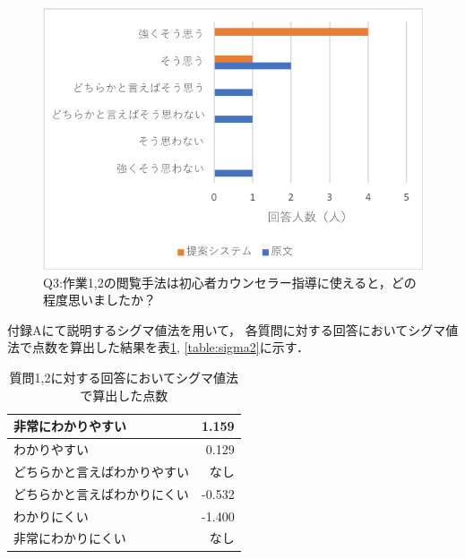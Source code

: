 \documentclass[shuuron]{kuee}
\begin{document}
\begin{figure}
  \begin{center}
    \includegraphics[width=\linewidth]{q3.png}
  \end{center}
  \caption{Q3:作業1,2の閲覧手法は初心者カウンセラー指導に使えると，どの程度思いましたか？}
  \label{fig:q3}
\end{figure}

付録Aにて説明するシグマ値法を用いて，
各質問に対する回答においてシグマ値法で点数を算出した結果を表\ref{table:sigma}, \ref{table:sigma2}に示す．


\begin{table}
  \caption{質問1,2に対する回答においてシグマ値法で算出した点数}
  \label{table:sigma}
  \begin{center}
    \begin{tabular}{|l|r|} \hline
      非常にわかりやすい & 1.159 \\ \hline
      わかりやすい  & 0.129 \\ \hline
      どちらかと言えばわかりやすい & なし \\ \hline
      どちらかと言えばわかりにくい & -0.532 \\ \hline
      わかりにくい  & -1.400 \\ \hline
      非常にわかりにくい & なし \\ \hline
    \end{tabular}
  \end{center}
\end{table}
\end{document}
